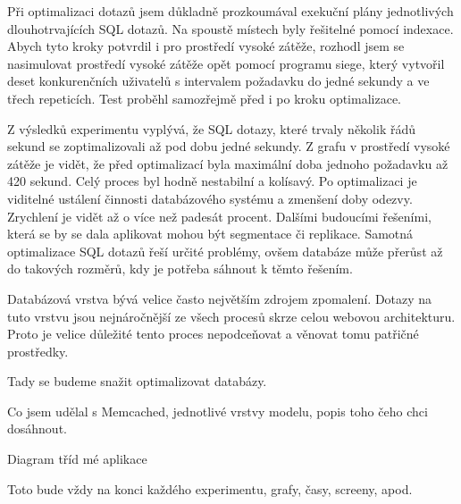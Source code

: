\documentclass[12pt]{article}
\begin{document}
Při optimalizaci dotazů jsem důkladně prozkoumával exekuční plány jednotlivých dlouhotrvajících SQL dotazů. Na spoustě místech byly řešitelné pomocí indexace. Abych tyto kroky potvrdil i pro prostředí vysoké zátěže, rozhodl jsem se nasimulovat prostředí vysoké zátěže opět pomocí programu siege, který vytvořil deset konkurenčních uživatelů s intervalem požadavku do jedné sekundy a ve třech repeticích. Test proběhl samozřejmě před i po kroku optimalizace.

\obrazek
{}

\obrazek
{}

\obrazek
{}

\clearpage

Z výsledků experimentu vyplývá, že SQL dotazy, které trvaly několik řádů sekund se zoptimalizovali až pod dobu jedné sekundy. Z grafu v prostředí vysoké zátěže je vidět, že před optimalizací byla maximální doba jednoho požadavku až 420 sekund. Celý proces byl hodně nestabilní a kolísavý. Po optimalizaci je viditelné ustálení činnosti databázového systému a zmenšení doby odezvy. Zrychlení je vidět až o více než padesát procent. Dalšími budoucími řešeními, která se by se dala aplikovat mohou být segmentace či replikace. Samotná optimalizace SQL dotazů řeší určité problémy, ovšem databáze může přerůst až do takových rozměrů, kdy je potřeba sáhnout k těmto řešením.

Databázová vrstva bývá velice často největším zdrojem zpomalení. Dotazy na tuto vrstvu jsou nejnáročnější ze všech procesů skrze celou webovou architekturu. Proto je velice důležité tento proces nepodceňovat a věnovat tomu patřičné prostředky.

Tady se budeme snažit optimalizovat databázy.

Co jsem udělal s Memcached, jednotlivé vrstvy modelu, popis toho čeho chci dosáhnout.

Diagram tříd mé aplikace

Toto bude vždy na konci každého experimentu, grafy, časy, screeny, apod.
\end{document}
